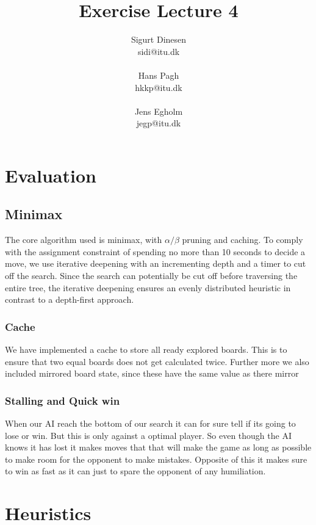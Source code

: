 \documentclass[a4paper, titlepage]{article}
\begin{document}
\title{Exercise Lecture 4}
\author{Sigurt Dinesen \\sidi@itu.dk \\\\ Hans Pagh \\hkkp@itu.dk 
\\\\Jens Egholm \\jegp@itu.dk}
\maketitle
\pagebreak

\section*{Evaluation}
\subsection*{Minimax}
The core algorithm used is minimax, with $\alpha/\beta$ pruning and caching.  To
comply with the assignment constraint of spending no more than 10 seconds to
decide a move, we use iterative deepening with an incrementing depth and a timer
to cut off the search. Since the search can potentially be cut off before
traversing the entire tree, the iterative deepening ensures an evenly
distributed heuristic in contrast to a depth-first approach.

\subsubsection*{Cache}
We have implemented a cache to store all ready explored boards. This is to
ensure that two equal boards does not get calculated twice. Further more we also
included mirrored board state, since these have the same value as there mirror

\subsubsection*{Stalling and Quick win}
When our AI reach the bottom of our search it can for sure tell if its going to
lose or win. But this is only against a optimal player. So even though the AI
knows it has lost it makes moves that that will make the game as long as
possible to make room for the opponent to make mistakes. Opposite of this it
makes sure to win as fast as it can just to spare the opponent of any
humiliation.

\section*{Heuristics}
\end{document}
